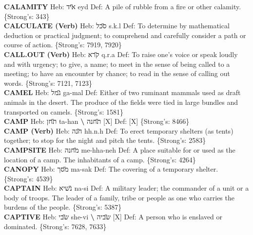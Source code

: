 {\textbf{CALAMITY} Heb: {\large\H איד} eyd Def: A pile of rubble from a fire or other calamity. \{Strong's: 343\}\hfill{}\\

\textbf{CALCULATE (Verb)} Heb: {\large\H סכל} s.k.l Def: To determine by mathematical deduction or practical judgment; to comprehend and carefully consider a path or course of action. \{Strong's: 7919, 7920\}\hfill{}\\

\textbf{CALL.OUT (Verb)} Heb: {\large\H קרא} q.r.a Def: To raise one's voice or speak loudly and with urgency; to give, a name; to meet in the sense of being called to a meeting; to have an encounter by chance; to read in the sense of calling out words. \{Strong's: 7121, 7123\}\hfill{}\\

\textbf{CAMEL} Heb: {\large\H גמל} ga-mal Def: Either of two ruminant mammals used as draft animals in the desert. The produce of the fields were tied in large bundles and transported on camels. \{Strong's: 1581\}\hfill{}\\

\textbf{CAMP} Heb: {\large\H תחן} ta-han \textbf{\textbackslash{}} {\large\H תחנה} {[}X{]} Def: {[}X{]} \{Strong's: 8466\}\hfill{}\\

\textbf{CAMP (Verb)} Heb: {\large\H חנה} hh.n.h Def: To erect temporary shelters (as tents) together; to stop for the night and pitch the tents. \{Strong's: 2583\}\hfill{}\\

\textbf{CAMPSITE} Heb: {\large\H מחנה} me-hha-neh Def: A place suitable for or used as the location of a camp. The inhabitants of a camp. \{Strong's: 4264\}\hfill{}\\

\textbf{CANOPY} Heb: {\large\H מסך} ma-sak Def: The covering of a temporary shelter. \{Strong's: 4539\}\hfill{}\\

\textbf{CAPTAIN} Heb: {\large\H נשיא} na-si Def: A military leader; the commander of a unit or a body of troops. The leader of a family, tribe or people as one who carries the burdens of the people. \{Strong's: 5387\}\hfill{}\\

\textbf{CAPTIVE} Heb: {\large\H שבי} she-vi \textbf{\textbackslash{}} {\large\H שביה} {[}X{]} Def: A person who is enslaved or dominated. \{Strong's: 7628, 7633\}\hfill{}\\

}
